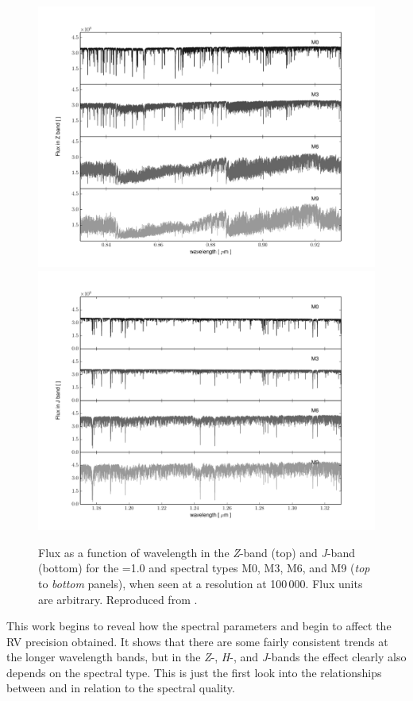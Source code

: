 \begin{figure}
    \centering
    \includegraphics[width=0.78\linewidth]{figures/information-content/figueria_2016_figures/Zband}\\
    \includegraphics[width=0.78\linewidth]{figures/information-content/figueria_2016_figures/Jband}
    \caption{Flux as a function of wavelength in the \emph{Z}-band (top) and \emph{J}-band (bottom) for the \Vsini{}=1.0\kmps{} and spectral types {M0}, {M3}, {M6}, and {M9} (\textit{top} to \textit{bottom} panels), when seen at a resolution at 100\,000.
        Flux units are arbitrary.
        Reproduced from \citet{figueira_radial_2016}.}
    \label{fig:z_and_j_spectra}
\end{figure}

This work begins to reveal how the spectral parameters \Logg{} and \feh{} begin to affect the {RV} precision obtained.
It shows that there are some fairly consistent trends at the longer wavelength bands, but in the \emph{Z}-, \emph{H}-, and \emph{J}-bands the effect clearly also depends on the spectral type.
This is just the first look into the relationships between \feh{} and \Logg{} in relation to the spectral quality.


